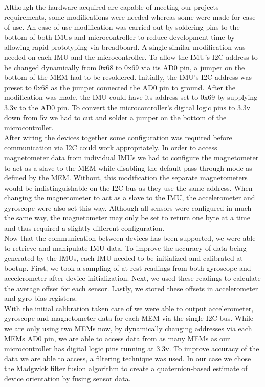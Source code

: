 Although the hardware acquired are capable of meeting our projects requirements, some modifications were needed whereas some were made for ease of use.
An ease of use modification was carried out by soldering pins to the bottom of both IMUs and microcontroller to reduce development time by allowing rapid prototyping via breadboard.
A single similar modification was needed on each IMU and the microcontroller.
To allow the IMU's I2C address to be changed dynamically from 0x68 to 0x69 via its AD0 pin, a jumper on the bottom of the MEM had to be resoldered.
Initially, the IMU's I2C address was preset to 0x68 as the jumper connected the AD0 pin to ground.
After the modification was made, the IMU could have its address set to 0x69 by supplying 3.3v to the AD0 pin.
To convert the microcontroller's digital logic pins to 3.3v down from 5v we had to cut and solder a jumper on the bottom of the microcontroller.\\

After wiring the devices together some configuration was required before communication via I2C could work appropriately.
In order to access magnetometer data from individual IMUs we had to configure the magnetometer  to act as a slave to the MEM while disabling the default pass through mode as defined by the MEM.
Without, this modification the separate magnetometers would be indistinguishable on the I2C bus as they use the same address.
When changing the magnetometer to act as a slave to the IMU, the accelerometer and gyroscope were also set this way.
Although all sensors were configured in much the same way, the magnetometer may only be set to return one byte at a time and thus required a slightly different configuration.\\

Now that the communication between devices has been supported, we were able to retrieve and manipulate IMU data.
To improve the accuracy of data being generated by the IMUs, each IMU needed to be initialized and calibrated at bootup.
First, we took a sampling of at-rest readings from both gyroscope and accelerometer after device initialization.
Next, we used these readings to calculate the average offset for each sensor.
Lastly, we stored these offsets in accelerometer and gyro bias registers.\\

With the initial calibration taken care of we were able to output accelerometer, gyroscope and magnetometer data for each MEM via the single I2C bus.
While we are only using two MEMs now, by dynamically changing addresses via each MEMs AD0 pin, we are able to access data from as many MEMs as our microcontroller has digital logic pins running at 3.3v.
To improve accuracy of the data we are able to access, a filtering technique was used.
In our case we chose the Madgwick filter fusion algorithm to create a quaternion-based estimate of device orientation by fusing sensor data.\\

